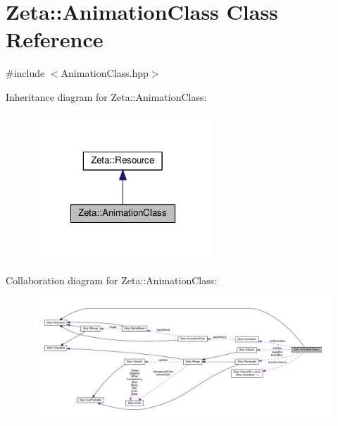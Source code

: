\hypertarget{classZeta_1_1AnimationClass}{\section{Zeta\+:\+:Animation\+Class Class Reference}
\label{classZeta_1_1AnimationClass}
}


{\ttfamily \#include $<$Animation\+Class.\+hpp$>$}



Inheritance diagram for Zeta\+:\+:Animation\+Class\+:\nopagebreak
\begin{figure}[H]
\begin{center}
\leavevmode
\includegraphics[width=190pt]{classZeta_1_1AnimationClass__inherit__graph}
\end{center}
\end{figure}


Collaboration diagram for Zeta\+:\+:Animation\+Class\+:
\nopagebreak
\begin{figure}[H]
\begin{center}
\leavevmode
\includegraphics[width=350pt]{classZeta_1_1AnimationClass__coll__graph}
\end{center}
\end{figure}
